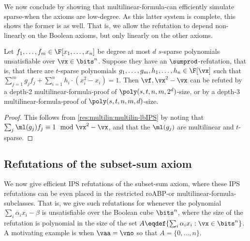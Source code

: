 \documentclass{toc}
\begin{document}
We now conclude by showing that multilinear-formula-\lbIPS can efficiently simulate sparse-\lIPS when the axioms are low-degree. As this latter system is complete, this shows the former is as well. That is, we allow the refutation to depend non-linearly on the Boolean axioms, but only linearly on the other axioms.

\begin{corollary}\label{res:multilin:simulate-sparse}
        Let $f_1,\ldots,f_m\in\F[x_1,\ldots,x_n]$ be degree at most $d$ $s$-sparse polynomials unsatisfiable over $\vx\in\bits^n$.  Suppose they have an $\sumprod$-\lIPS refutation, that is, that there are $t$-sparse polynomials $g_1,\ldots,g_m,h_1,\ldots,h_n\in\F[\vx]$ such that $\sum_{j=1}^m g_j f_j+\sum_{i=1}^n h_i \cdot (x_i^2-x_i)=1$.  Then $\vf,\vx^2-\vx$ can be refuted by a depth-2 multilinear-formula-\lbIPS proof of $\poly(s,t,n,m,2^d)$-size, or by a depth-3 multilinear-formula-\lbIPS proof of $\poly(s,t,n,m,d)$-size.
\end{corollary}
\begin{proof}
        This follows from \autoref{res:multilin:multilin-lbIPS} by noting that $\sum_j \ml(g_j)f_j\equiv 1\mod \vx^2-\vx$, and that the $\ml(g_j)$ are multilinear and $t$-sparse.
\end{proof}

\subsection{Refutations of the subset-sum axiom}\label{sec:subset:ub}

We now give efficient IPS refutations of the subset-sum axiom, where these IPS refutations can be even placed in the restricted roABP-\lIPS or multilinear-formula-\lIPS subclasses.  That is, we give such refutations for whenever the polynomial $\sum_i \alpha_ix_i-\beta$ is unsatisfiable over the Boolean cube $\bits^n$, where the size of the refutation is polynomial in the size of the set $A\eqdef\{\sum_i \alpha_ix_i: \vx\in\bits^n\}$.  A motivating example is when $\vaa=\vno$ so that $A=\{0,\ldots,n\}$.
\end{document}
